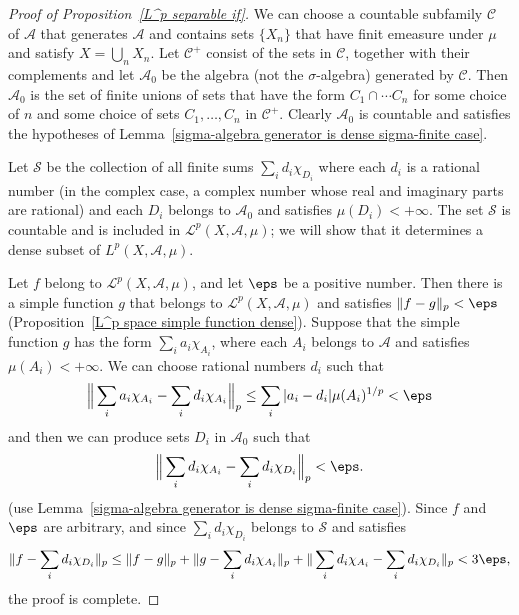 \begin{proof}[Proof of Proposition~\ref{L^p separable if}]
We can choose a countable subfamily $\mathcal{C}$ of $\mathcal{A}$ that generates $\mathcal{A}$ and contains sets $\{X_n\}$ that have finit emeasure under $\mu$ and satisfy $X=\bigcup_nX_n$. Let $\mathcal{C}^+$ consist of the sets in $\mathcal{C}$, together with their complements and let $\mathcal{A}_0$ be the algebra (not the $\sigma$-algebra) generated by $\mathcal{C}$. Then $\mathcal{A}_0$ is the set of finite unions of sets that have the form $C_1\cap\cdots C_n$ for some choice of $n$ and some choice of sets $C_1,\dots,C_n$ in $\mathcal{C}^+$. Clearly $\mathcal{A}_0$ is countable and satisfies the hypotheses of Lemma~\ref{sigma-algebra generator is dense sigma-finite case}.\par
Let $\mathcal{S}$ be the collection of all finite sums $\sum_id_i\chi_{D_i}$ where each $d_i$ is a rational number (in the complex case, a complex number whose real and imaginary parts are rational) and each $D_i$ belongs to $\mathcal{A}_0$ and satisfies $\mu(D_i)<+\infty$. The set $\mathcal{S}$ is countable and is included in $\mathcal{L}^p(X,\mathcal{A},\mu)$; we will show that it determines a dense subset of $L^p(X,\mathcal{A},\mu)$.\par
Let $f$ belong to $\mathcal{L}^p(X,\mathcal{A},\mu)$, and let $\eps$ be a positive number. Then there is a simple function $g$ that belongs to $\mathcal{L}^p(X,\mathcal{A},\mu)$ and satisfies $\|f-g\|_p<\eps$ (Proposition~\ref{L^p space simple function dense}). Suppose that the simple function $g$ has the form $\sum_ia_i\chi_{A_i}$, where each $A_i$ belongs to $\mathcal{A}$ and satisfies $\mu(A_i)<+\infty$. We can choose rational numbers $d_i$ such that
\[\Big\|\sum_ia_i\chi_{A_i}-\sum_id_i\chi_{A_i}\Big\|_p\leq\sum_i|a_i-d_i|\mu(A_i)^{1/p}<\eps\]
and then we can produce sets $D_i$ in $\mathcal{A}_0$ such that
\[\Big\|\sum_id_i\chi_{A_i}-\sum_id_i\chi_{D_i}\Big\|_p<\eps.\]
(use Lemma~\ref{sigma-algebra generator is dense sigma-finite case}). Since $f$ and $\eps$ are arbitrary, and since $\sum_id_i\chi_{D_i}$ belongs to $\mathcal{S}$ and satisfies
\[\|f-\sum_id_i\chi_{D_i}\|_p\leq\|f-g\|_p+\|g-\sum_id_i\chi_{A_i}\|_p+\|\sum_id_i\chi_{A_i}-\sum_id_i\chi_{D_i}\|_p<3\eps,\]
the proof is complete.
\end{proof}
